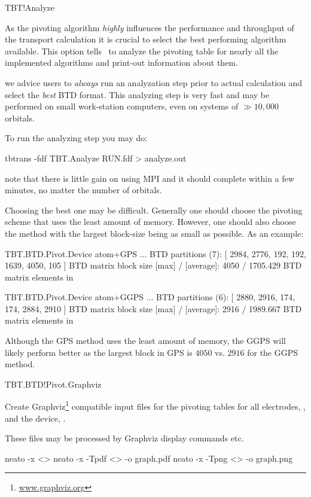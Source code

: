 \begin{fdflogicalF}{TBT!Analyze}

  As the pivoting algorithm \emph{highly} influences the performance
  and throughput of the transport calculation it is crucial to select
  the best performing algorithm available. This option tells \tbtrans\
  to analyze the pivoting table for nearly all the implemented
  algorithms and print-out information about them.

  \note we advice users to \emph{always} run an analyzation step prior
  to actual calculation and select the \emph{best} BTD format. This
  analyzing step is very fast and may be performed on small
  work-station computers, even on systems of $\gg10,000$ orbitals.

  To run the analyzing step you may do:
  \begin{shellexample}
    tbtrans -fdf TBT.Analyze RUN.fdf > analyze.out
  \end{shellexample}
  note that there is little gain on using MPI and it should complete
  within a few minutes, no matter the number of orbitals.

  Choosing the best one may be difficult. Generally one should choose
  the pivoting scheme that uses the least amount of memory. However,
  one should also choose the method with the largest block-size being
  as small as possible. As an example:
  \begin{shellexample}
TBT.BTD.Pivot.Device atom+GPS
...
    BTD partitions (7): 
     [ 2984, 2776, 192, 192, 1639, 4050, 105 ]
    BTD matrix block size [max] / [average]: 4050 /   1705.429
    BTD matrix elements in %

TBT.BTD.Pivot.Device atom+GGPS
...
    BTD partitions (6): 
     [ 2880, 2916, 174, 174, 2884, 2910 ]
    BTD matrix block size [max] / [average]: 2916 /   1989.667
    BTD matrix elements in %

  \end{shellexample}
  Although the GPS method uses the least amount of memory, the GGPS
  will likely perform better as the largest block in GPS is $4050$
  vs. $2916$ for the GGPS method. 

\end{fdflogicalF}


\begin{fdflogicalF}{TBT.BTD!Pivot.Graphviz}

  Create Graphviz\footnote{\url{www.graphviz.org}} compatible input
  files for the pivoting tables for all electrodes,
  , and the device, .

  These files may be processed by Graphviz display commands
   etc.

  \begin{shellexample}
    neato -x <>
    neato -x -Tpdf <> -o graph.pdf
    neato -x -Tpng <> -o graph.png
  \end{shellexample}
  
\end{fdflogicalF}


